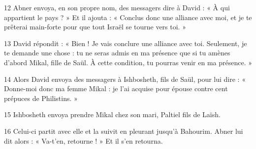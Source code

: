 
12 Abner envoya, en son propre nom, des messagers dire à David : « À qui appartient le pays ? » Et il ajouta : « Conclus donc une alliance avec moi, et je te prêterai main-forte pour que tout Israël se tourne vers toi. »

13 David répondit : « Bien ! Je vais conclure une alliance avec toi. Seulement, je te demande une chose : tu ne seras admis en ma présence que si tu amènes d’abord Mikal, fille de Saül. À cette condition, tu pourras venir en ma présence. »

14 Alors David envoya des messagers à Ishbosheth, fils de Saül, pour lui dire : « Donne-moi donc ma femme Mikal : je l’ai acquise pour épouse contre cent prépuces de Philistins. »

15 Ishbosheth envoya prendre Mikal chez son mari, Paltiel fils de Laïsh.

16 Celui-ci partit avec elle et la suivit en pleurant jusqu’à Bahourim. Abner lui dit alors : « Va-t’en, retourne ! » Et il s’en retourna.
